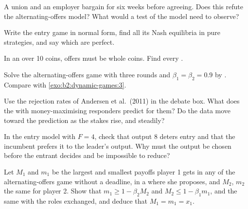 \begin{exercise}[$\star$]\label{exo:b2:dynamic-games:4}
A union and an employer bargain for six weeks before agreeing. Does this refute the alternating-offers model?
What would a test of the model need to observe?
\end{exercise}

\begin{exercise}[$\star\star$]\label{exo:b2:dynamic-games:5}
Write the entry game in normal form, find all its Nash equilibria in pure strategies, and say which are
 perfect.
\end{exercise}

\begin{exercise}[$\star\star$]\label{exo:b2:dynamic-games:6}
In an  over 10 coins, offers must be whole coins. Find every .
\end{exercise}

\begin{exercise}[$\star\star$]\label{exo:b2:dynamic-games:7}
Solve the alternating-offers game with three rounds and $\beta_1 = \beta_2 = 0.9$ by . Compare with
\cref{exo:b2:dynamic-games:3}.
\end{exercise}

\begin{exercise}[$\star\star$]\label{exo:b2:dynamic-games:8}
Use the rejection rates of Andersen et al.\ (2011) in the debate box. What does the 
with money-maximising responders predict for them? Do the data move toward the prediction as the stakes rise,
and steadily?
\end{exercise}

\begin{exercise}[$\star\star$]\label{exo:b2:dynamic-games:9}
In the entry model with $F = 4$, check that output 8 deters entry and that the incumbent prefers it to the
leader's output. Why must the output be chosen before the entrant decides and be impossible to reduce?
\end{exercise}

\begin{exercise}[$\star\star\star$]\label{exo:b2:dynamic-games:10}
Let $M_1$ and $m_1$ be the largest and smallest payoffs player 1 gets in any  of the
alternating-offers game without a deadline, in a  where she proposes, and $M_2$, $m_2$ the same for player 2.
Show that $m_1 \ge 1 - \beta_2 M_2$ and $M_2 \le 1 - \beta_1 m_1$, and the same with the roles exchanged, and deduce that $M_1 = m_1
= x_1$.
\end{exercise}

